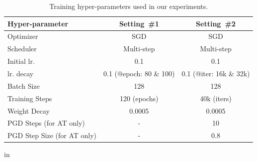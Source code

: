 \documentclass[conference]{IEEEtran}
\theoremstyle{definition}
\theoremstyle{remark}
\theoremstyle{proposition}
\begin{document}
\begin{table}[tb!]
	\caption{Training hyper-parameters used in our experiments.}
	\label{tab:settings}
	\begin{center}
		\begin{small}
			\begin{tabular}{lcc}
				\toprule
				\textbf{Hyper-parameter}           & \textbf{Setting~\#1}             & \textbf{Setting~\#2} \\
				\midrule
				Optimizer                          & SGD                              & SGD\\
				Scheduler                          & Multi-step                       & Multi-step\\
				Initial lr.                        & 0.1                              & 0.1\\
				lr. decay                          & 0.1 (@epoch: 80 \& 100)          & 0.1 (@iter: 16k \& 32k)\\
				Batch Size                         & 128                              & 128\\
				Training Steps                     & 120 (epochs)                     & 40k (iters)\\
                Weight Decay                       & 0.0005                           & 0.0005\\
                PGD Steps (for AT only)            & -                                & 10\\
                PGD Step Size (for AT only)        & -                                & 0.8\\
				\bottomrule
			\end{tabular}
		\end{small}
	\end{center}
     in
\end{table}
\end{document}

